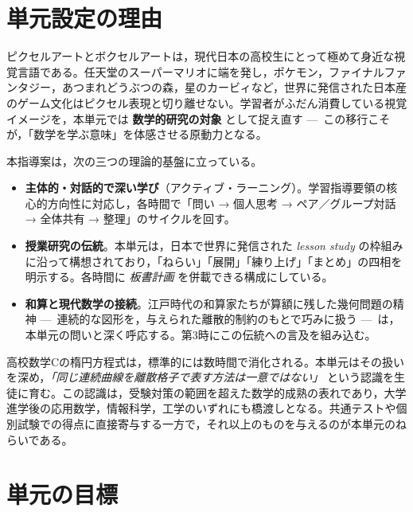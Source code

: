 \documentclass[12pt,a4paper]{scrartcl}
\newcommand{\acc}[1]{\textcolor{accent}{\textbf{#1}}}
\begin{document}
\section{単元設定の理由}

ピクセルアートとボクセルアートは，現代日本の高校生にとって極めて身近な視覚言語である。任天堂のスーパーマリオに端を発し，ポケモン，ファイナルファンタジー，あつまれどうぶつの森，星のカービィなど，世界に発信された日本産のゲーム文化はピクセル表現と切り離せない。学習者がふだん消費している視覚イメージを，本単元では \acc{数学的研究の対象} として捉え直す ---\, この移行こそが，「数学を学ぶ意味」を体感させる原動力となる。

本指導案は，次の三つの理論的基盤に立っている。

\begin{itemize}[leftmargin=1.3em,itemsep=0.15em,topsep=0.3em]
  \item \acc{主体的・対話的で深い学び}（アクティブ・ラーニング）。学習指導要領の核心的方向性に対応し，各時間で「問い → 個人思考 → ペア／グループ対話 → 全体共有 → 整理」のサイクルを回す。
  \item \acc{授業研究の伝統}。本単元は，日本で世界に発信された \emph{lesson study} の枠組みに沿って構想されており，「ねらい」「展開」「練り上げ」「まとめ」の四相を明示する。各時間に \emph{板書計画} を併載できる構成にしている。
  \item \acc{和算と現代数学の接続}。江戸時代の和算家たちが算額に残した幾何問題の精神 ---\, 連続的な図形を，与えられた離散的制約のもとで巧みに扱う ---\, は，本単元の問いと深く呼応する。第3時にこの伝統への言及を組み込む。
\end{itemize}

\begin{ryuui}
高校数学Cの楕円方程式は，標準的には数時間で消化される。本単元はその扱いを深め，\emph{「同じ連続曲線を離散格子で表す方法は一意ではない」} という認識を生徒に育む。この認識は，受験対策の範囲を超えた数学的成熟の表れであり，大学進学後の応用数学，情報科学，工学のいずれにも橋渡しとなる。共通テストや個別試験での得点に直接寄与する一方で，それ以上のものを与えるのが本単元のねらいである。
\end{ryuui}

\section{単元の目標}
\end{document}
